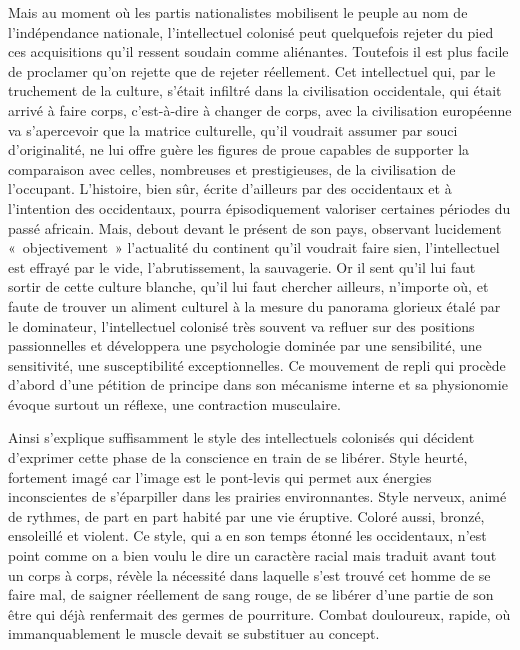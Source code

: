 \documentclass[french,twoside]{book} %
\begin{document}
\noindent Mais au moment où les partis nationalistes mobilisent le peuple au nom de l’indépendance nationale, l’intellectuel colonisé peut quelquefois rejeter du pied ces acquisitions qu’il   ressent soudain comme aliénantes. Toutefois il est plus facile de proclamer qu’on rejette que de rejeter réellement. Cet intellectuel qui, par le truchement de la culture, s’était infiltré dans la civilisation occidentale, qui était arrivé à faire corps, c’est-à-dire à changer de corps, avec la civilisation européenne va s’apercevoir que la matrice culturelle, qu’il voudrait assumer par souci d’originalité, ne lui offre guère les figures de proue capables de supporter la comparaison avec celles, nombreuses et prestigieuses, de la civilisation de l’occupant. L’histoire, bien sûr, écrite d’ailleurs par des occidentaux et à l’intention des occidentaux, pourra épisodiquement valoriser certaines périodes du passé africain. Mais, debout devant le présent de son pays, observant lucidement « objectivement » l’actualité du continent qu’il voudrait faire sien, l’intellectuel est effrayé par le vide, l’abrutissement, la sauvagerie. Or il sent qu’il lui faut sortir de cette culture blanche, qu’il lui faut chercher ailleurs, n’importe où, et faute de trouver un aliment culturel à la mesure du panorama glorieux étalé par le dominateur, l’intellectuel colonisé très souvent va refluer sur des positions passionnelles et développera une psychologie dominée par une sensibilité, une sensitivité, une susceptibilité exceptionnelles. Ce mouvement de repli qui procède d’abord d’une pétition de principe dans son mécanisme interne et sa physionomie évoque surtout un réflexe, une contraction musculaire.\par
\bigbreak
\noindent Ainsi s’explique suffisamment le style des intellectuels colonisés qui décident d’exprimer cette phase de la conscience en train de se libérer. Style heurté, fortement imagé car l’image est le pont-levis qui permet aux énergies inconscientes de s’éparpiller dans les prairies environnantes. Style nerveux, animé de rythmes, de part en part habité par une vie éruptive. Coloré aussi, bronzé, ensoleillé et violent. Ce style, qui a en son temps étonné les occidentaux, n’est point comme on a bien voulu le dire un caractère racial mais traduit avant tout un corps à corps, révèle la nécessité dans laquelle s’est trouvé cet homme de se faire mal, de saigner réellement de sang rouge, de se libérer   d’une partie de son être qui déjà renfermait des germes de pourriture. Combat douloureux, rapide, où immanquablement le muscle devait se substituer au concept.\par
\end{document}
